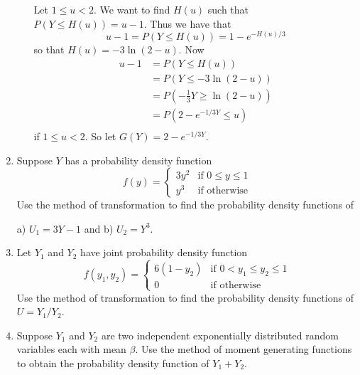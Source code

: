 \documentclass[9pt]{article}
\begin{document}
\begin{enumerate}
\begin{enumerate}
               Let $1 \le u < 2$. We want to find $H(u)$ such that
               $P(Y \le H(u)) = u - 1$. Thus we have that
               $$u - 1 = P(Y \le H(u)) = 1 - e^{-H(u)/3}$$
               so that $H(u) = -3\ln(2 - u)$. Now
               \begin{align*}
                  u - 1 &= P(Y \le H(u)) \\
                        &= P(Y \le -3\ln(2 - u)) \\
                        &= P\left(-\frac{1}{3}Y \ge \ln(2 - u)\right) \\
                        &= P\left(2 - e^{-1/3Y} \le u\right) \\
               \end{align*}
               if $1 \le u < 2$. So let $G(Y) = 2 - e^{-1/3Y}$.
      \end{enumerate}
   \item Suppose $Y$ has a probability density function
         \begin{equation*}
            f(y) = \begin{cases}
               3y^2   & \text{if } 0 \le y \le 1 \\
               y^3 & \text{if } \text{otherwise}
            \end{cases}
         \end{equation*}
         Use the method of transformation to find the probability density
         functions of 

         a) $U_1 = 3Y - 1$ and \qquad b) $U_2 = Y^3$.
   \item Let $Y_1$ and $Y_2$ have joint probability density function         
         \begin{equation*}
            f(y_1, y_2) = \begin{cases}
               6(1 - y_2)   & \text{if } 0 < y_1 \le y_2 \le 1 \\
               0 & \text{if } \text{otherwise}
            \end{cases}
         \end{equation*}
         Use the method of transformation to find the probability density
         functions of $U = Y_1 / Y_2$.
         
   \item Suppose $Y_1$ and $Y_2$ are two independent exponentially distributed
         random variables each with mean $\beta$. Use the method of moment
         generating functions to obtain the probability density function of
         $Y_1 + Y_2$.
\end{enumerate}
\end{document}
